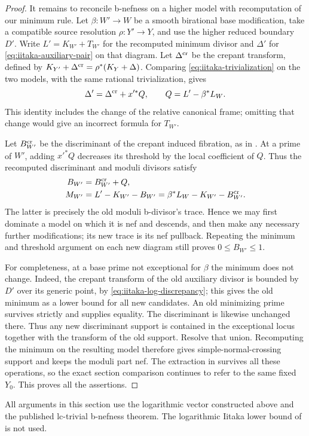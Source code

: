\begin{proof}
It remains to reconcile b-nefness on a higher model with recomputation
of our minimum rule.  Let \(\beta:W'\to W\) be a smooth birational
base modification, take a compatible source resolution
\(\rho:Y'\to Y\), and use the higher reduced boundary \(D'\).
Write \(L'=K_{W'}+T_{W'}\) for the recomputed minimum divisor and
\(\Delta'\) for \eqref{eq:iitaka-auxiliary-pair} on that diagram.
Let \(\Delta^{\rm cr}\) be the crepant transform, defined by
\(K_{Y'}+\Delta^{\rm cr}=\rho^*(K_Y+\Delta)\).  Comparing
\eqref{eq:iitaka-trivialization} on the two models, with the same
rational trivialization, gives
\begin{equation}\label{eq:iitaka-normalization-change}
 \Delta'=\Delta^{\rm cr}+x'^*Q,
 \qquad Q=L'-\beta^*L_W.
\end{equation}
This identity includes the change of the relative canonical frame;
omitting that change would give an incorrect formula for \(T_{W'}\).

Let \(B^{\rm cr}_{W'}\) be the discriminant of the crepant induced
fibration, as in \cite[\S3.3]{FG}.  At a prime of \(W'\), adding
\(x'^*Q\) decreases its threshold by the local coefficient of
\(Q\).  Thus the recomputed discriminant and moduli divisors satisfy
\begin{equation}\label{eq:iitaka-moduli-compatibility}
 \begin{split}
 B_{W'}&=B^{\rm cr}_{W'}+Q,\\
 M_{W'}&=L'-K_{W'}-B_{W'}
       =\beta^*L_W-K_{W'}-B^{\rm cr}_{W'}.
 \end{split}
\end{equation}
The latter is precisely the old moduli b-divisor's trace.  Hence we
may first dominate a model on which it is nef and descends, and then
make any necessary further modifications; its new trace is its nef
pullback.  Repeating the minimum and threshold argument on each new
diagram still proves \(0\le B_{W'}\le1\).

For completeness, at a base prime not exceptional for \(\beta\) the
minimum does not change.  Indeed, the crepant transform of the old
auxiliary divisor is bounded by \(D'\) over its generic point, by
\eqref{eq:iitaka-log-discrepancy}; this gives the old minimum as a
lower bound for all new candidates.  An old minimizing prime survives
strictly and supplies equality.  The discriminant is likewise
unchanged there.  Thus any new discriminant support is contained in
the exceptional locus together with the transform of the old support.
Resolve that union.  Recomputing the minimum on the resulting model
therefore gives simple-normal-crossing support and keeps the moduli
part nef.  The extraction in  survives
all these operations, so the exact section comparison continues to
refer to the same fixed \(Y_0\).  This proves all the assertions.
\end{proof}

All arguments in this section use the logarithmic vector constructed
above and the published lc-trivial b-nefness theorem.  The logarithmic
Iitaka lower bound of  is not used.

